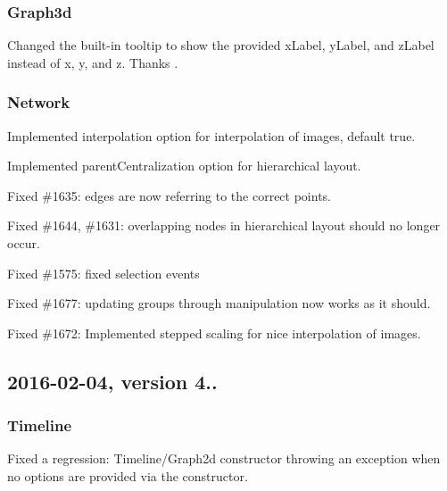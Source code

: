 \subsubsection*{Graph3d}


\begin{DoxyItemize}
\item Changed the built-\/in tooltip to show the provided {\ttfamily x\+Label}, {\ttfamily y\+Label}, and {\ttfamily z\+Label} instead of {\ttfamily \textquotesingle{}x\textquotesingle{}}, {\ttfamily \textquotesingle{}y\textquotesingle{}}, and {\ttfamily \textquotesingle{}z\textquotesingle{}}. Thanks .
\end{DoxyItemize}

\subsubsection*{Network}


\begin{DoxyItemize}
\item Implemented interpolation option for interpolation of images, default true.
\item Implemented parent\+Centralization option for hierarchical layout.
\item Fixed \#1635\+: edges are now referring to the correct points.
\item Fixed \#1644, \#1631\+: overlapping nodes in hierarchical layout should no longer occur.
\item Fixed \#1575\+: fixed selection events
\item Fixed \#1677\+: updating groups through manipulation now works as it should.
\item Fixed \#1672\+: Implemented stepped scaling for nice interpolation of images.
\end{DoxyItemize}

\subsection*{2016-\/02-\/04, version 4..}

\subsubsection*{Timeline}


\begin{DoxyItemize}
\item Fixed a regression\+: Timeline/\+Graph2d constructor throwing an exception when no options are provided via the constructor.
\end{DoxyItemize}


